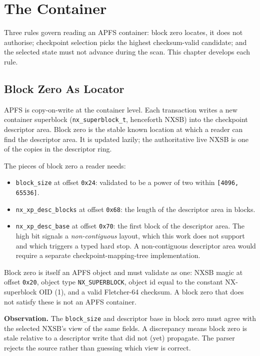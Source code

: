 \chapter{The Container}

Three rules govern reading an APFS container: block zero locates,
it does not authorise; checkpoint selection picks the highest
checksum-valid candidate; and the selected state must not advance
during the scan. This chapter develops each rule.

\section{Block Zero As Locator}

APFS is copy-on-write at the container level. Each transaction writes a
new container superblock (\texttt{nx\_superblock\_t}, henceforth NXSB)
into the checkpoint descriptor area. Block zero is the stable known
location at which a reader can find the descriptor area. It is updated
lazily; the authoritative live NXSB is one of the copies in the
descriptor ring.

The pieces of block zero a reader needs:

\begin{itemize}
  \item \texttt{block\_size} at offset \texttt{0x24}: validated to be a
    power of two within \texttt{[4096, 65536]}.
  \item \texttt{nx\_xp\_desc\_blocks} at offset \texttt{0x68}: the
    length of the descriptor area in blocks.
  \item \texttt{nx\_xp\_desc\_base} at offset \texttt{0x70}: the first
    block of the descriptor area. The high bit signals a
    \emph{non-contiguous} layout, which this work does not support
    and which triggers a typed hard stop. A non-contiguous descriptor area
    would require a separate checkpoint-mapping-tree implementation.
\end{itemize}

Block zero is itself an APFS object and must validate as one: NXSB
magic at offset \texttt{0x20}, object type \texttt{NX\_SUPERBLOCK},
object id equal to the constant NX-superblock OID (1), and a valid
Fletcher-64 checksum. A block zero that does not satisfy these is not
an APFS container.

\textbf{Observation.} The \texttt{block\_size} and descriptor base in
block zero must agree with the selected NXSB's view of the same
fields. A discrepancy means block zero is stale relative to a
descriptor write that did not (yet) propagate. The parser rejects
the source rather than guessing which view is correct.

